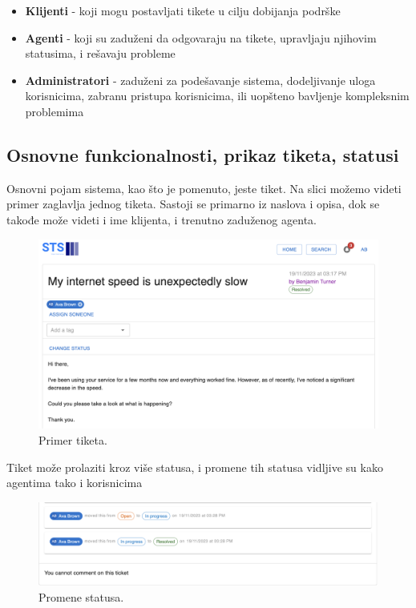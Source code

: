 \documentclass[12pt,oneside]{memoir}
\begin{document}
\begin{itemize}
    \item \textbf{Klijenti} - koji mogu postavljati tikete u cilju dobijanja podrške
    \item \textbf{Agenti} - koji su zaduženi da odgovaraju na tikete, upravljaju njihovim statusima, i rešavaju probleme
    \item \textbf{Administratori} - zaduženi za podešavanje sistema, dodeljivanje uloga korisnicima, zabranu pristupa korisnicima, ili uopšteno bavljenje kompleksnim problemima 
\end{itemize}

\subsection{Osnovne funkcionalnosti, prikaz tiketa, statusi}

Osnovni pojam sistema, kao što je pomenuto, jeste tiket. Na slici možemo videti primer zaglavlja jednog tiketa. Sastoji se primarno iz naslova i opisa, dok se takođe može videti i ime klijenta, i trenutno zaduženog agenta.

\begin{figure}[h]
  \centering
  \includegraphics[width=1\textwidth]{docs/images/ch_1/ticket-title.png} 
  \caption{Primer tiketa.}
\end{figure}

Tiket može prolaziti kroz više statusa, i promene tih statusa vidljive su kako agentima tako i korisnicima

\begin{figure}[h]
  \centering
  \includegraphics[width=1\textwidth]{docs/images/ch_1/ticket-statuses.png} 
  \caption{Promene statusa.}
\end{figure}
\end{document}
